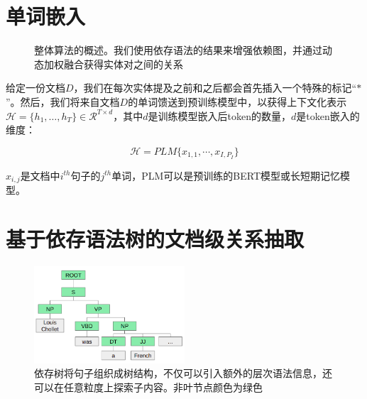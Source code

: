 \documentclass[bachelor]{thesis-uestc}
\begin{document}
\section{单词嵌入}
\begin{figure}[t]
    \caption{整体算法的概述。我们使用依存语法的结果来增强依赖图，并通过动态加权融合获得实体对之间的关系}
    \label{fig_overview}
\end{figure}

给定一份文档$D$，我们在每次实体提及之前和之后都会首先插入一个特殊的标记“$*$”。然后，我们将来自文档$D$的单词馈送到预训练模型中，以获得上下文化表示 $\mathcal{H}=\{h_1, \dots, h_T\} \in \mathcal{R}^{T \times d}$，其中$d$是训练模型嵌入后token的数量，$d$是token嵌入的维度：

\begin{equation}
    \mathcal{H} = PLM \{x_{1,1},\cdots, x_{I,P_I}\}
    \label{PLM}
\end{equation}

$x_{i, j}$是文档中$i^{th}$句子的$j^{th}$单词，PLM可以是预训练的BERT模型或长短期记忆模型。

\section{基于依存语法树的文档级关系抽取}

\begin{figure}[t]
    \includegraphics[width=0.5\textwidth]{misc/constituency.png}
    \caption{依存树将句子组织成树结构，不仅可以引入额外的层次语法信息，还可以在任意粒度上探索子内容。非叶节点颜色为绿色} 
    \label{fig_syn_b}
\end{figure}
\end{document}
